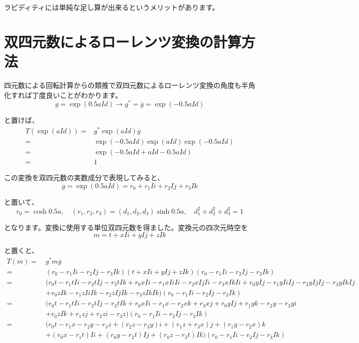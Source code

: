 \documentclass[a4paper,12pt,notitlepage]{jsreport}
\begin{document}
ラピディティには単純な足し算が出来るというメリットがあります。

\section{双四元数によるローレンツ変換の計算方法}

四元数による回転計算からの類推で双四元数によるローレンツ変換の角度も半角化すれば丁度良いことがわかります。
\begin{equation}
  g=\exp(0.5aId) \to g^*=\overline{g}=\exp(-0.5aId)
\end{equation}

と置けば、
\begin{equation}
  \begin{split}
    T(\exp(aId))=&g^*\exp(aId)\overline{g}\\
    =&\exp(-0.5aId)\exp(aId)\exp(-0.5aId)\\
    =&\exp(-0.5aId+aId-0.5aId)\\
    =&1
  \end{split}
\end{equation}

この変換を双四元数の実数成分で表現してみると、
\begin{equation}
  g=\exp(0.5aId)=r_0+r_1Ii+r_2Ij+r_3Ik
\end{equation}

と置いて、
\begin{equation}
  r_0=\cosh 0.5a,\quad (r_1,r_2,r_3)=(d_1,d_2,d_3)\sinh 0.5a,\quad d_1^2+d_2^2+d_3^2=1
\end{equation}

となります。変換に使用する単位双四元数を得ました。変換元の四次元時空を
\begin{equation}
  m=t+xIi+yIj+zIk
\end{equation}

と置くと、
\begin{equation}
  \begin{split}
    T(m)=~&g^*m\overline{g}\\
    =~&(r_0-r_1Ii-r_2Ij-r_3Ik)(t+xIi+yIj+zIk)(r_0-r_1Ii-r_2Ij-r_3Ik)\\
    =~&(r_0t-r_1tIi-r_2tIj-r_3tIk+r_0xIi-r_1xIiIi-r_2xIjIi-r_3xIkIi+r_0yIj-r_1yIiIj-r_2yIjIj-r_3yIkIj\\
    &+r_0zIk-r_1zIiIk-r_2zIjIk-r_3zIkIk)(r_0-r_1Ii-r_2Ij-r_3Ik)\\
    =~&(r_0t-r_1tIi-r_2tIj-r_3tIk+r_0xIi-r_1x-r_2xk+r_3xj+r_0yIj+r_1yk-r_2y-r_3yi\\
    &+r_0zIk+r_1zj+r_2zi-r_3z)(r_0-r_1Ii-r_2Ij-r_3Ik)\\
    =~&(r_0t-r_1x-r_2y-r_3z+(r_2z-r_3y)i+(r_1z+r_3x)j+(r_1y-r_2x)k\\
    &+(r_0x-r_1t)Ii+(r_0y-r_2t)Ij+(r_0z-r_3t)Ik)(r_0-r_1Ii-r_2Ij-r_3Ik)\\
  \end{split}
\end{equation}
\end{document}
